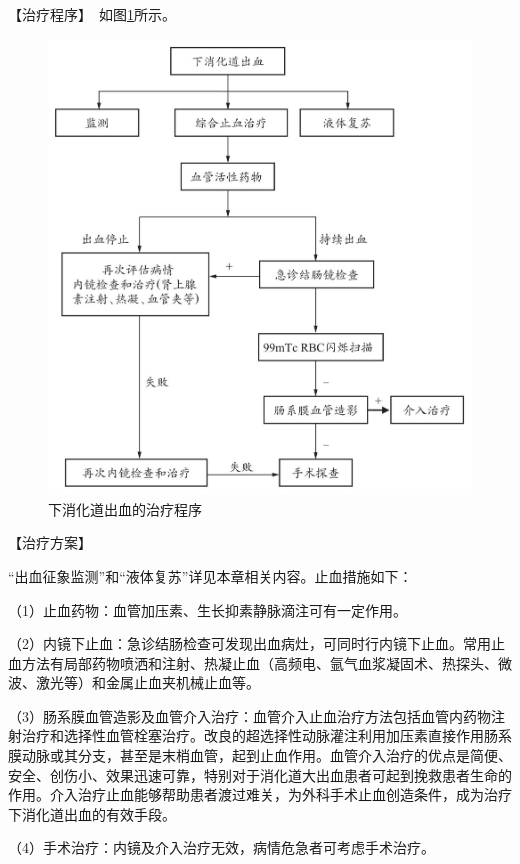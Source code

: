 【治疗程序】　如图\ref{fig3-22-3}所示。

\begin{figure}[!htbp]
 \centering
 \includegraphics{./images/Image00119.jpg}
 \captionsetup{justification=centering}
 \caption{下消化道出血的治疗程序}
 \label{fig3-22-3}
  \end{figure} 

【治疗方案】

“出血征象监测”和“液体复苏”详见本章相关内容。止血措施如下：

（1）止血药物：血管加压素、生长抑素静脉滴注可有一定作用。

（2）内镜下止血：急诊结肠检查可发现出血病灶，可同时行内镜下止血。常用止血方法有局部药物喷洒和注射、热凝止血（高频电、氩气血浆凝固术、热探头、微波、激光等）和金属止血夹机械止血等。

（3）肠系膜血管造影及血管介入治疗：血管介入止血治疗方法包括血管内药物注射治疗和选择性血管栓塞治疗。改良的超选择性动脉灌注利用加压素直接作用肠系膜动脉或其分支，甚至是末梢血管，起到止血作用。血管介入治疗的优点是简便、安全、创伤小、效果迅速可靠，特别对于消化道大出血患者可起到挽救患者生命的作用。介入治疗止血能够帮助患者渡过难关，为外科手术止血创造条件，成为治疗下消化道出血的有效手段。

（4）手术治疗：内镜及介入治疗无效，病情危急者可考虑手术治疗。

